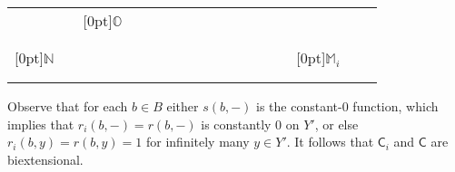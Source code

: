 \documentclass{LMCS}
\begin{document}
\begin{center}
\begin{tabular}{c ccc  ccc ccc cc  ccccc}
       &  \multicolumn{1}{c}{}  & \multicolumn{1}{c}{\raisebox{-7.5ex}[0pt]{$\mathbb{O}$}}
        &   \multicolumn{1}{c|}{}     \\  & \multicolumn{1}{|c}{} &    \multicolumn{1}{c}{} & \multicolumn{1}{c}{}      &  \multicolumn{1}{c}{} &    \multicolumn{1}{c}{} & \multicolumn{1}{c}{}      &  \multicolumn{1}{c}{} &    \multicolumn{1}{c}{} & \multicolumn{1}{c}{}     &  \multicolumn{1}{c}{}  &  \multicolumn{1}{c|}{} &                    \multicolumn{1}{c}{} & \multicolumn{1}{c}{}  & \multicolumn{1}{c}{} & \multicolumn{1}{c|}{} \\  & \multicolumn{1}{|c}{} &    \multicolumn{1}{c}{} & \multicolumn{1}{c}{}      &  \multicolumn{1}{c}{} &    \multicolumn{1}{c}{} & \multicolumn{1}{c}{}      &  \multicolumn{1}{c}{} &    \multicolumn{1}{c}{} & \multicolumn{1}{c}{}     &  \multicolumn{1}{c}{}  &  \multicolumn{1}{c|}{} &                    \multicolumn{1}{c}{} & \multicolumn{1}{c}{}  & \multicolumn{1}{c}{} & \multicolumn{1}{c|}{} \\  \cline{13-16}
        \raisebox{-4.5ex}[0pt]{$\mathbb{N}$}           & \multicolumn{1}{|c}{} &    \multicolumn{1}{c}{} & \multicolumn{1}{c}{}      &  \multicolumn{1}{c}{} &    \multicolumn{1}{c}{} & \multicolumn{1}{c}{}      &  \multicolumn{1}{c}{} &    \multicolumn{1}{c}{} & \multicolumn{1}{c}{}     &  \multicolumn{1}{c}{}  &  \multicolumn{1}{c|}{}     &  \multicolumn{1}{c}{}
       &  \multicolumn{1}{c}{}  & \multicolumn{1}{c}{\raisebox{-4.5ex}[0pt]{$\mathbb{M}_i$}}
        &   \multicolumn{1}{c|}{}     \\  & \multicolumn{1}{|c}{} &    \multicolumn{1}{c}{} & \multicolumn{1}{c}{}      &  \multicolumn{1}{c}{} &    \multicolumn{1}{c}{} & \multicolumn{1}{c}{}      &  \multicolumn{1}{c}{} &    \multicolumn{1}{c}{} & \multicolumn{1}{c}{}     &  \multicolumn{1}{c}{}  &  \multicolumn{1}{c|}{} &                    \multicolumn{1}{c}{} & \multicolumn{1}{c}{}  & \multicolumn{1}{c}{} & \multicolumn{1}{c|}{} \\  & \multicolumn{1}{|c}{} &    \multicolumn{1}{c}{} & \multicolumn{1}{c}{}      &  \multicolumn{1}{c}{} &    \multicolumn{1}{c}{} & \multicolumn{1}{c}{}      &  \multicolumn{1}{c}{} &    \multicolumn{1}{c}{} & \multicolumn{1}{c}{}     &  \multicolumn{1}{c}{}  &  \multicolumn{1}{c|}{} &                    \multicolumn{1}{c}{} & \multicolumn{1}{c}{}  & \multicolumn{1}{c}{} & \multicolumn{1}{c|}{} \\  \cline{2-16}

    \end{tabular}
\end{center}
Observe that for each $b \in B$ either $s(b, -)$ is the constant-$0$
function, which implies that $r_i(b,-) = r(b,-) $ is constantly $0$ on
$Y'$, or else $r_i(b,y) = r(b,y)=1$ for infinitely many $y \in Y'$. It
follows that $\mathsf{C}_i$ and $\mathsf{C}$ are biextensional.
\end{document}
